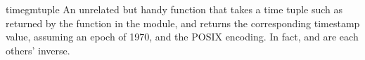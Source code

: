 \begin{funcdesc}{timegm}{tuple}
An unrelated but handy function that takes a time tuple such as
returned by the  function in the 
module, and returns the corresponding \UNIX{} timestamp value, assuming
an epoch of 1970, and the POSIX encoding.  In fact,
 and  are each others' inverse.
\end{funcdesc}


\begin{seealso}
\end{seealso}
